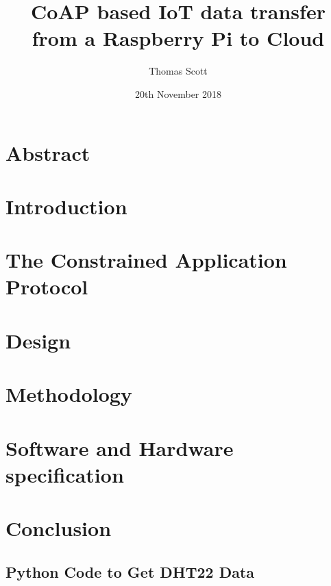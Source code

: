 \documentclass[11pt]{article}
\title{CoAP based IoT data transfer from a Raspberry Pi to Cloud}
\author{Thomas Scott}
\date{20th November 2018}
\begin{document}
	\maketitle
	\newpage

	\section{Abstract}
	

	\section{Introduction}
	

	\section{The Constrained Application Protocol}
	

	\section{Design}
	

	\section{Methodology}
	

	\section{Software and Hardware specification}
	

	\section{Conclusion}
	

	\begin{appendices}
		
		\section{Python Code to Get DHT22 Data}
		
		
	\end{appendices}

	\printglossaries

	
	
\end{document}
